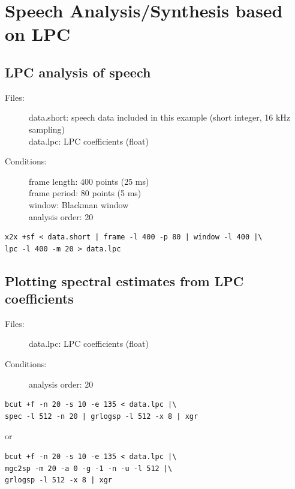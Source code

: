 \documentclass[a4paper,10pt]{article}
\begin{document}
\section{Speech Analysis/Synthesis based on LPC}

\subsection{LPC analysis of speech}

\begin{description}
\item[Files:]
  data.short: speech data included in this example (short integer, 16 kHz sampling)\\
  data.lpc: LPC coefficients (float)
\item[Conditions:]
  frame length: 400 points (25 ms)\\
  frame period: 80 points (5 ms)\\
  window: Blackman window\\
  analysis order: 20
\end{description}

\begin{verbatim}
x2x +sf < data.short | frame -l 400 -p 80 | window -l 400 |\
lpc -l 400 -m 20 > data.lpc
\end{verbatim}

\subsection{Plotting spectral estimates from LPC coefficients}

\begin{description}
\item[Files:]
  data.lpc: LPC coefficients (float)
\item[Conditions:]
  analysis order: 20
\end{description}

\begin{verbatim}
bcut +f -n 20 -s 10 -e 135 < data.lpc |\
spec -l 512 -n 20 | grlogsp -l 512 -x 8 | xgr
\end{verbatim}

or

\begin{verbatim}
bcut +f -n 20 -s 10 -e 135 < data.lpc |\
mgc2sp -m 20 -a 0 -g -1 -n -u -l 512 |\
grlogsp -l 512 -x 8 | xgr
\end{verbatim}
\end{document}
